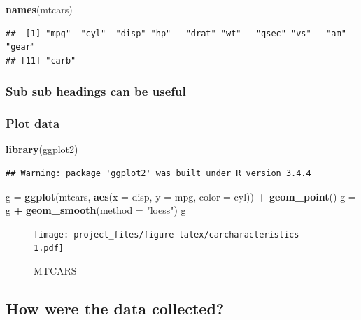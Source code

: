\documentclass[]{article}
\newenvironment{Shaded}{\begin{snugshade}}{\end{snugshade}}
\newcommand{\KeywordTok}[1]{\textcolor[rgb]{0.13,0.29,0.53}{\textbf{#1}}}
\newcommand{\DataTypeTok}[1]{\textcolor[rgb]{0.13,0.29,0.53}{#1}}
\newcommand{\StringTok}[1]{\textcolor[rgb]{0.31,0.60,0.02}{#1}}
\newcommand{\OperatorTok}[1]{\textcolor[rgb]{0.81,0.36,0.00}{\textbf{#1}}}
\newcommand{\NormalTok}[1]{#1}
\begin{document}
\begin{Shaded}
\begin{Highlighting}[]
\KeywordTok{names}\NormalTok{(mtcars)}
\end{Highlighting}
\end{Shaded}

\begin{verbatim}
##  [1] "mpg"  "cyl"  "disp" "hp"   "drat" "wt"   "qsec" "vs"   "am"   "gear"
## [11] "carb"
\end{verbatim}

\subsubsection{Sub sub headings can be
useful}\label{sub-sub-headings-can-be-useful}

\subsubsection{Plot data}\label{plot-data}

\begin{Shaded}
\begin{Highlighting}[]
\KeywordTok{library}\NormalTok{(ggplot2)}
\end{Highlighting}
\end{Shaded}

\begin{verbatim}
## Warning: package 'ggplot2' was built under R version 3.4.4
\end{verbatim}

\begin{Shaded}
\begin{Highlighting}[]
\NormalTok{g =}\StringTok{ }\KeywordTok{ggplot}\NormalTok{(mtcars, }\KeywordTok{aes}\NormalTok{(}\DataTypeTok{x =}\NormalTok{ disp, }\DataTypeTok{y =}\NormalTok{ mpg, }\DataTypeTok{color =}\NormalTok{ cyl)) }\OperatorTok{+}\StringTok{ }\KeywordTok{geom_point}\NormalTok{()}
\NormalTok{g =}\StringTok{ }\NormalTok{g }\OperatorTok{+}\StringTok{ }\KeywordTok{geom_smooth}\NormalTok{(}\DataTypeTok{method =} \StringTok{"loess"}\NormalTok{)}
\NormalTok{g}
\end{Highlighting}
\end{Shaded}

\begin{figure}
\centering
\texttt{[image: project\_files/figure-latex/carcharacteristics-1.pdf]}
\caption{MTCARS}
\end{figure}

\subsection{How were the data
collected?}\label{how-were-the-data-collected}
\end{document}
